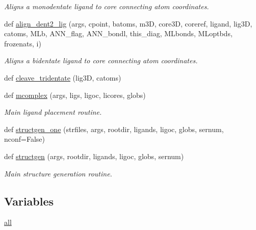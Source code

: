 \begin{DoxyCompactItemize}
\begin{DoxyCompactList}\small\item\em Aligns a monodentate ligand to core connecting atom coordinates. \end{DoxyCompactList}\item 
def \hyperlink{namespacemolSimplify_1_1Scripts_1_1structgen_a458be04ee9ec1f9d32c81b5b7448fcec}{align\+\_\+dent2\+\_\+lig} (args, cpoint, batoms, m3D, core3D, coreref, ligand, lig3D, catoms, M\+Lb, A\+N\+N\+\_\+flag, A\+N\+N\+\_\+bondl, this\+\_\+diag, M\+Lbonds, M\+Loptbds, frozenats, i)
\begin{DoxyCompactList}\small\item\em Aligns a bidentate ligand to core connecting atom coordinates. \end{DoxyCompactList}\item 
def \hyperlink{namespacemolSimplify_1_1Scripts_1_1structgen_a9bd3ad91740926954046d231532e5ebe}{cleave\+\_\+tridentate} (lig3D, catoms)
\item 
def \hyperlink{namespacemolSimplify_1_1Scripts_1_1structgen_a343f959db73f414f9f717d2a7f2ab18c}{mcomplex} (args, ligs, ligoc, licores, globs)
\begin{DoxyCompactList}\small\item\em Main ligand placement routine. \end{DoxyCompactList}\item 
def \hyperlink{namespacemolSimplify_1_1Scripts_1_1structgen_ac02db5841c0976072db2c43a255a4863}{structgen\+\_\+one} (strfiles, args, rootdir, ligands, ligoc, globs, sernum, nconf=False)
\item 
def \hyperlink{namespacemolSimplify_1_1Scripts_1_1structgen_a88cde12602c0445fff9fe6921415aad4}{structgen} (args, rootdir, ligands, ligoc, globs, sernum)
\begin{DoxyCompactList}\small\item\em Main structure generation routine. \end{DoxyCompactList}\end{DoxyCompactItemize}
\subsection*{Variables}
\begin{DoxyCompactItemize}
\item 
\hyperlink{namespacemolSimplify_1_1Scripts_1_1structgen_a2ef014c1f2b0eae8ccc7784c704bdfd9}{all}
\end{DoxyCompactItemize}


